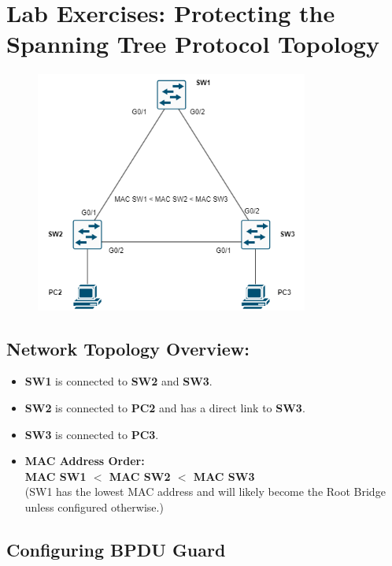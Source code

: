\documentclass[a4paper]{book}
\begin{document}
\newpage
\section*{Lab Exercises: Protecting the Spanning Tree Protocol Topology}

\begin{figure}[h]
	\centering
	\includegraphics[width=0.8\textwidth]{img/STPConvergence01.png}
	\caption{\textit{}}
\end{figure}

\subsection*{Network Topology Overview:}

\begin{itemize}
	\item \textbf{SW1} is connected to \textbf{SW2} and \textbf{SW3}.
	\item \textbf{SW2} is connected to \textbf{PC2} and has a direct link to \textbf{SW3}.
	\item \textbf{SW3} is connected to \textbf{PC3}.
	\item \textbf{MAC Address Order:} \\
	      \textbf{MAC SW1 $<$ MAC SW2 $<$ MAC SW3} \\
	      (SW1 has the lowest MAC address and will likely become the Root Bridge unless configured otherwise.)
\end{itemize}

\subsection*{Configuring BPDU Guard}
\end{document}
